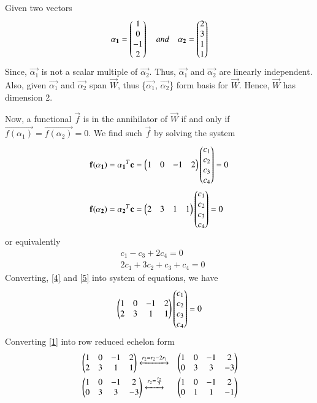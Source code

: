 \documentclass[journal,12pt,twocolumn]{IEEEtran}
\begin{document}
Given two vectors 
\begin{align}
\mathbf{\alpha_1} = \begin{pmatrix}1 \\ 0 \\ -1 \\ 2\end{pmatrix} \quad and \quad \mathbf{\alpha_2} = \begin{pmatrix}2 \\ 3 \\ 1 \\ 1\end{pmatrix}
\end{align}
Since, $\vec{\alpha_1}$ is not a scalar multiple of $\vec{\alpha_2}$. Thus, $\vec{\alpha_1}$ and $\vec{\alpha_2}$ are linearly independent. Also, given $\vec{\alpha_1}$ and $\vec{\alpha_2}$ span $\vec{W}$, thus \{$\vec{\alpha_1}$, $\vec{\alpha_2}$\} form basis for $\vec{W}$. Hence, $\vec{W}$ has dimension 2.

Now, a functional $\vec{f}$ is in the annihilator of $\vec{W}$ if and only if $\vec{f(\alpha_1)} = \vec{f(\alpha_2)} = 0$. We find such $\vec{f}$ by solving the system 
\begin{align}
& \mathbf{f(\alpha_1)} = \mathbf{\alpha_1}^T\mathbf{c} = \begin{pmatrix}1 & 0 & -1 & 2\end{pmatrix}\begin{pmatrix}c_1 \\ c_2 \\ c_3 \\ c_4\end{pmatrix} = 0 \\
& \mathbf{f(\alpha_2)} = \mathbf{\alpha_2}^T\mathbf{c} = \begin{pmatrix}2 & 3 & 1 & 1\end{pmatrix}\begin{pmatrix}c_1 \\ c_2 \\ c_3 \\ c_4\end{pmatrix} =  0
\end{align}
or equivalently
\begin{align}
& c_1 - c_3 + 2c_4 = 0  \label{4}\\
& 2c_1 + 3c_2 + c_3 + c_4 = 0 \label{5}
\end{align}
Converting, \eqref{4} and \eqref{5} into system of equations, we have
\begin{align}
\begin{pmatrix}1 & 0 & -1 & 2 \\ 2 & 3 & 1 & 1\end{pmatrix}\begin{pmatrix}c_1 \\ c_2 \\ c_3 \\ c_4\end{pmatrix} = 0 \label{1}
\end{align} 
Converting \eqref{1} into row reduced echelon form
\begin{align}
& \begin{pmatrix}1 & 0 & -1 & 2 \\ 2 & 3 & 1 & 1\end{pmatrix} \xleftrightarrow[]{r_2 = r_2 - 2r_1} & \begin{pmatrix}1 & 0 & -1 & 2 \\ 0 & 3 & 3 & -3\end{pmatrix} \\
& \begin{pmatrix}1 & 0 & -1 & 2 \\ 0 & 3 & 3 & -3\end{pmatrix} \xleftrightarrow[]{r_2 = \frac{r_2}{3}} & \begin{pmatrix}1 & 0 & -1 & 2 \\ 0 & 1 & 1 & -1\end{pmatrix} \label{2}
\end{align}
\end{document}

